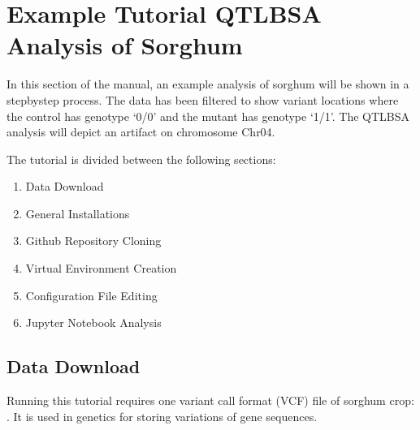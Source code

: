 \documentclass[letterpaper,10pt,english]{sphinxhowto}
\begin{document}
\section{Example Tutorial \sphinxhyphen{} QTL\sphinxhyphen{}BSA Analysis of Sorghum}
\label{\detokenize{index:example-tutorial-qtl-bsa-analysis-of-sorghum}}
\sphinxAtStartPar
In this section of the manual, an example analysis of sorghum will be shown in a step\sphinxhyphen{}by\sphinxhyphen{}step process. The data has been filtered to show variant locations where the control has genotype ‘0/0’ and the mutant has genotype ‘1/1’. The QTL\sphinxhyphen{}BSA analysis will depict an artifact on chromosome Chr04.

\sphinxAtStartPar
The tutorial is divided between the following sections:
\begin{enumerate}
%
\item {} 
\sphinxAtStartPar
Data Download

\item {} 
\sphinxAtStartPar
General Installations

\item {} 
\sphinxAtStartPar
Github Repository Cloning

\item {} 
\sphinxAtStartPar
Virtual Environment Creation

\item {} 
\sphinxAtStartPar
Configuration File Editing

\item {} 
\sphinxAtStartPar
Jupyter Notebook Analysis

\end{enumerate}


\subsection{Data Download}
\label{\detokenize{index:data-download}}
\sphinxAtStartPar
Running this tutorial requires one variant call format (VCF) file of sorghum crop: . It is used in genetics for storing variations of gene sequences.
\end{document}
